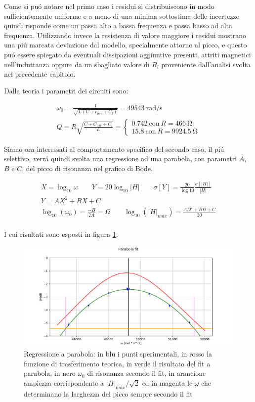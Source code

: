 \documentclass{article}
\begin{document}
Come si pu\'o notare nel primo caso i residui si distribuiscono in modo sufficientemente uniforme e a meno di una minima sottostima delle incertezze quindi risponde come un passa alto a bassa frequenza e passa basso ad alta frequenza. Utilizzando invece la resistenza di valore maggiore i residui mostrano una pi\'u marcata deviazione dal modello, specialmente attorno al picco, e questo pu\'o essere spiegato da eventuali dissipazioni aggiuntive presenti, attriti magnetici nell'induttanza oppure da un sbagliato valore di $R_l$ proveniente dall'analisi svolta nel precedente capitolo.

Dalla teoria i parametri dei circuiti sono:

\begin{gather}
	\nonumber
	\omega_0 = \frac{1}{\sqrt{L(C+c_{osc}+C_l)}} = 49543\ \si{\radian\per\second} \\
	\nonumber
	Q = R \sqrt{\frac{C+C_{osc}+C_l}{L}} = 
	\begin{cases}  
	0.742 \ \mathrm{con} \  R=466\ \si{\ohm} \\
	15.8 \  \mathrm{con}\  R=9924.5\ \si{\ohm}
	\end{cases}
\end{gather}

Siamo ora interessati al comportamento specifico del secondo caso, il pi\'u selettivo, verr\'a quindi svolta una regressione ad una parabola, con parametri $A$, $B$ e $C$, del picco di risonanza nel grafico di Bode.

\begin{gather}
	\nonumber
	X=\log_{10}{\omega} \qquad
	Y=20 \log_{10}{|H|} \qquad
	\sigma[Y]=\frac{20}{\log{10}} \frac{\sigma[|H|]}{|H|} \\
	Y=A X^2 + B X + C \\
	\log_{10}{(\omega_0)} = \frac{-B}{2A} = \Omega \qquad 
	\log_{10}{(|H|_{max})} = \frac{A \Omega^2 + B \Omega + C}{20} \\
\end{gather}

I cui risultati sono esposti in figura \ref{fig:figp}.

\begin{figure}[h]
\centering
\includegraphics[width=\textwidth]{figp.pdf}
\caption{Regressione a parabola: in blu i punti sperimentali, in rosso la funzione di trasferimento teorica, in verde il risultato del fit a parabola, in nero $\omega_0$ di risonanza secondo il fit, in arancione ampiezza corrispondente a $|H|_{max}/\sqrt{2}$ ed in magenta le $\omega$ che determinano la larghezza del picco sempre secondo il fit}
\label{fig:figp}
\end{figure}
\end{document}

